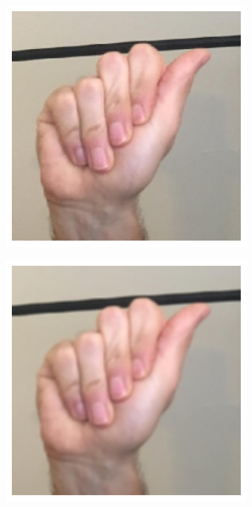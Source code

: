 \begin{figure}[H]
  \centering
 \begin{subfigure}{0.18\textwidth}
      \includegraphics[width=\linewidth]{images/2-recunoasterea-asl/imagine_a_originala.png}
      \caption{}
    \end{subfigure}
    \begin{subfigure}{0.18\textwidth}
      \includegraphics[width=\linewidth]{images/2-recunoasterea-asl/imagine_a_blur.png}

\end{subfigure}
\end{figure}
